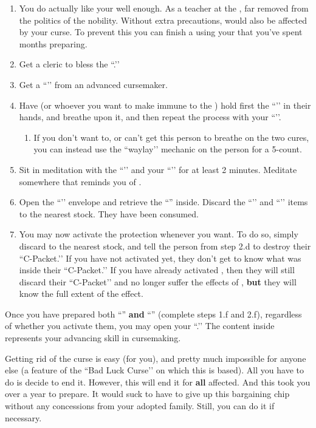 \documentclass[green]{GL2020}
\begin{document}
\begin{enumerate}
  \begin{enumerate}
    \item You do actually like your \cMusic{\auncle{}} \cMusic{} well enough. As a teacher at the \pSchool{}, \cMusic{\they} \cMusic{\are} far removed from the politics of the \pFarm{} nobility. Without extra precautions, \cMusic{} would also be affected by your curse. To prevent this you can finish a \iProtection{} using your \iWIPProtection{} that you’ve spent months preparing.
    \item Get a cleric to bless the ``\iWIPProtection{}.’’
    \item Get a ``\iSlowActingPoisonCure{}’’ from an advanced cursemaker.
    \item Have \cMusic{} (or whoever you want to make immune to the \iWithering{}) hold first the ``\iSlowActingPoisonCure{}’’ in their hands, and breathe upon it, and then repeat the process with your ``\iWIPProtection{}’’.
  \begin{enumerate}
    \item If you don’t want to, or can’t get this person to breathe on the two cures, you can instead use the ``waylay’’ mechanic on the person for a 5-count.
  \end{enumerate}
    \item Sit in meditation with the ``\iSlowActingPoisonCure{}’’ and your ``\iWIPProtection{}’’ for at least 2 minutes. Meditate somewhere that reminds you of \cFarmGod{}.
    \item Open the ``\iWIPProtection{}’’ envelope and retrieve the ``\iProtection{}'' inside. Discard the ``\iSlowActingPoisonCure{}’’ and ``\iWIPProtection{}’’ items to the nearest stock. They have been consumed.
    \item  You may now activate the protection whenever you want. To do so, simply discard \iProtection{} to the nearest stock, and tell the person from step 2.d to destroy their ``C-Packet.’’ If you have not activated \iWithering{} yet, they don’t get to know what was inside their ``C-Packet.’’ If you have already activated \iWithering{}, then they will still discard their ``C-Packet’’ and no longer suffer the effects of \iWithering{}, \textbf{but} they will know the full extent of the effect.
  \end{enumerate}
\end{enumerate}

Once you have prepared both ``\iWithering{}'' \textbf{and} ``\iProtection{}'' (complete steps 1.f and 2.f), regardless of whether you activate them, you may open your ``\mPacketThree{}.’’ The content inside represents your advancing skill in cursemaking.

Getting rid of the curse is easy (for you), and pretty much impossible for anyone else (a feature of the ``Bad Luck Curse’’ on which this is based). All you have to do is decide to end it. However, this will end it for \textbf{all} affected. And this took you over a year to prepare. It would suck to have to give up this bargaining chip without any concessions from your adopted family. Still, you can do it if necessary.
\end{document}
